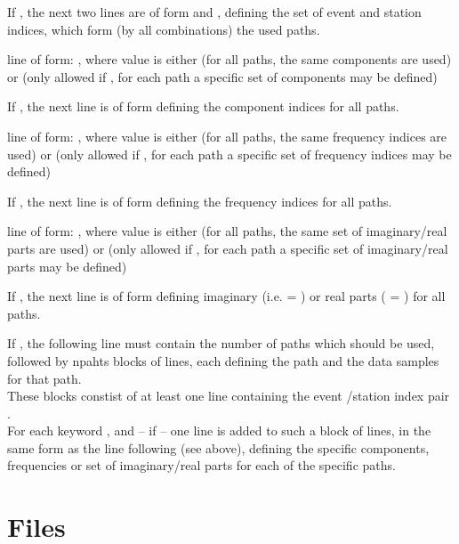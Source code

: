 If , the next two lines are of form  and , defining the set
of event and station indices, which form (by all combinations) the used paths. 

line of form: , where value is either  (for all paths, the same components are used) or 
(only allowed if , for each path a specific set of components may be defined)

If , the next line is of form  defining the component indices for all paths.

line of form: , where value is either  (for all paths, the same frequency indices are used) or 
(only allowed if , for each path a specific set of frequency indices may be defined)

If , the next line is of form  defining the frequency indices for all paths.

line of form: , where value is either  (for all paths, the same set of imaginary/real parts are used) or 
(only allowed if , for each path a specific set of imaginary/real parts may be defined)

If , the next line is of form  defining imaginary (i.e.  = ) or real parts 
( = ) for all paths.

If , the following line must contain the number  of paths which should be used, followed by 
npahts blocks of lines, each defining the path and the data samples for that path. \\
These blocks constist of at least one line containing the event /station index pair . \\
For each keyword ,  and  -- if  -- one line is added to such a block 
of lines, in the same form as the line following  (see above), 
defining the specific components, frequencies or set of imaginary/real parts for each of the specific paths.
%
\section{ Files} \label{files,sec:ecart_invgrid}
%
